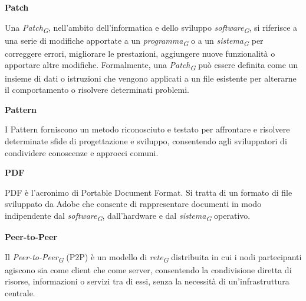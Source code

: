 \documentclass{article}
\begin{document}
\vspace{0.4cm}

\textbf{Patch}

\vspace{0.1cm}

Una \textit{Patch}\textsubscript{\textit{G}}, nell'ambito dell'informatica e dello sviluppo \textit{software}\textsubscript{\textit{G}}, si riferisce a una serie di modifiche apportate a un \textit{programma}\textsubscript{\textit{G}} o a un \textit{sistema}\textsubscript{\textit{G}} per correggere errori, migliorare le prestazioni, aggiungere nuove funzionalità o apportare altre modifiche. Formalmente, una \textit{Patch}\textsubscript{\textit{G}} può essere definita come un insieme di dati o istruzioni che vengono applicati a un file esistente per alterarne il comportamento o risolvere determinati problemi.

\vspace{0.4cm}

\textbf{Pattern}

\vspace{0.1cm}

I Pattern forniscono un metodo riconosciuto e testato per affrontare e risolvere determinate sfide di progettazione e sviluppo, consentendo agli sviluppatori di condividere conoscenze e approcci comuni.

\vspace{0.4cm}

\textbf{PDF}

\vspace{0.1cm}

PDF è l'acronimo di Portable Document Format. Si tratta di un formato di file sviluppato da Adobe che consente di rappresentare documenti in modo indipendente dal \textit{software}\textsubscript{\textit{G}}, dall'hardware e dal \textit{sistema}\textsubscript{\textit{G}} operativo.

\vspace{0.4cm}

\textbf{Peer-to-Peer}

\vspace{0.1cm}

Il \textit{Peer-to-Peer}\textsubscript{\textit{G}} (P2P) è un modello di \textit{rete}\textsubscript{\textit{G}} distribuita in cui i nodi partecipanti agiscono sia come client che come server, consentendo la condivisione diretta di risorse, informazioni o servizi tra di essi, senza la necessità di un'infrastruttura centrale.

\vspace{0.4cm}
\end{document}
